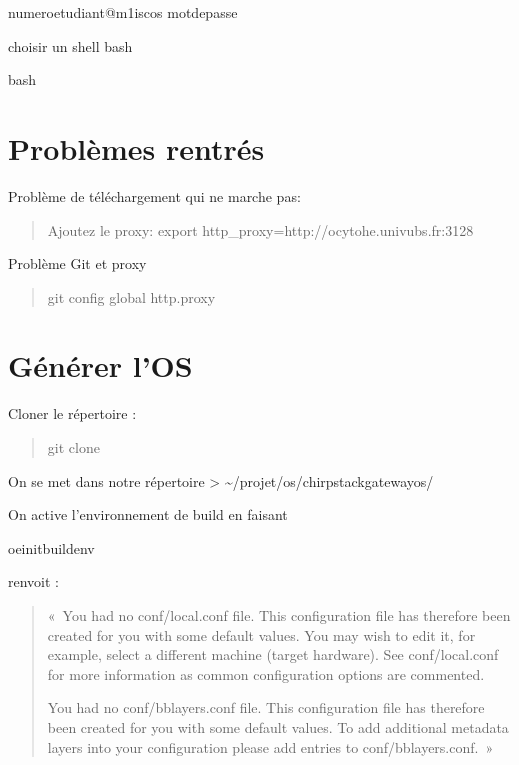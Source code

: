 \documentclass[letterpaper,10pt,french]{sphinxmanual}
\begin{document}
\begin{sphinxVerbatim}[commandchars=\\\{\}]
numeroetudiant@m1\PYGZhy{}isc\PYGZhy{}os
motdepasse
\end{sphinxVerbatim}

choisir un shell bash

\begin{sphinxVerbatim}[commandchars=\\\{\}]
bash
\end{sphinxVerbatim}


\section{Problèmes rentrés}
\label{\detokenize{securisationGW:problemes-rentres}}
Problème de téléchargement qui ne marche pas:
\begin{quote}

Ajoutez le proxy: export http\_proxy=http://ocytohe.univ\sphinxhyphen{}ubs.fr:3128
\end{quote}

Problème Git et proxy
\begin{quote}

git config \textendash{}global http.proxy 
\end{quote}


\section{Générer l’OS}
\label{\detokenize{securisationGW:generer-l-os}}
Cloner le répertoire :
\begin{quote}

git clone 
\end{quote}

On se met dans notre répertoire \textgreater{} \textasciitilde{}/projet/os/chirpstack\sphinxhyphen{}gateway\sphinxhyphen{}os/

On active l’environnement de build en faisant

\begin{sphinxVerbatim}[commandchars=\\\{\}]
 oe\PYGZhy{}init\PYGZhy{}build\PYGZhy{}env
\end{sphinxVerbatim}

renvoit :
\begin{quote}

« You had no conf/local.conf file. This configuration file has therefore been created for you with some default values.
You may wish to edit it, for example, select a different machine (target hardware). See conf/local.conf for more information as common configuration options are commented.

You had no conf/bblayers.conf file. This configuration file has therefore been created for you with some default values.
To add additional metadata layers into your configuration please add entries to conf/bblayers.conf. »
\end{quote}
\end{document}
